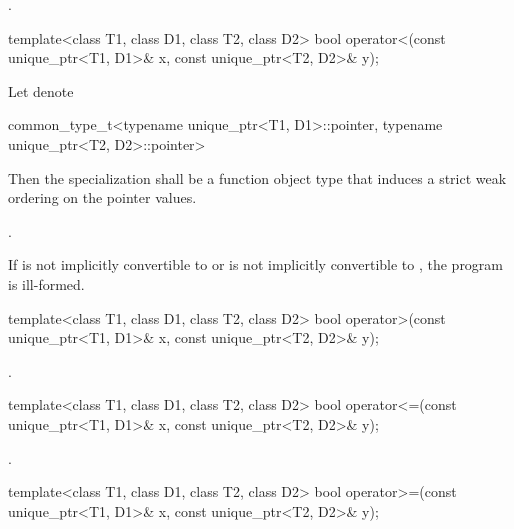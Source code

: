 \begin{itemdescr}
\pnum
\returns
{}.
\end{itemdescr}

%
\begin{itemdecl}
template<class T1, class D1, class T2, class D2>
  bool operator<(const unique_ptr<T1, D1>& x, const unique_ptr<T2, D2>& y);
\end{itemdecl}

\begin{itemdescr}
\pnum
\requires Let  denote
\begin{codeblock}
common_type_t<typename unique_ptr<T1, D1>::pointer,
              typename unique_ptr<T2, D2>::pointer>
\end{codeblock}
Then the specialization
 shall be a function object type that
induces a strict weak ordering on the pointer values.

\pnum
\returns
{}.

\pnum
\remarks
If  is not implicitly convertible
to  or  is not implicitly
convertible to , the program is ill-formed.
\end{itemdescr}

%
\begin{itemdecl}
template<class T1, class D1, class T2, class D2>
  bool operator>(const unique_ptr<T1, D1>& x, const unique_ptr<T2, D2>& y);
\end{itemdecl}

\begin{itemdescr}
\pnum
\returns
{}.
\end{itemdescr}

%
\begin{itemdecl}
template<class T1, class D1, class T2, class D2>
  bool operator<=(const unique_ptr<T1, D1>& x, const unique_ptr<T2, D2>& y);
\end{itemdecl}

\begin{itemdescr}
\pnum
\returns
{}.
\end{itemdescr}

%
\begin{itemdecl}
template<class T1, class D1, class T2, class D2>
  bool operator>=(const unique_ptr<T1, D1>& x, const unique_ptr<T2, D2>& y);
\end{itemdecl}

